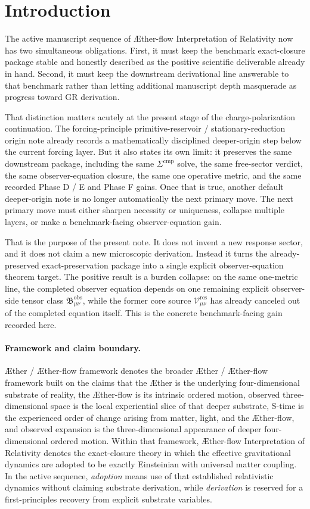 \documentclass[11pt]{article}
\newcommand{\Aether}{\AE{}ther}
\newcommand{\Aflow}{\AE{}ther-flow}
\newcommand{\TheoryName}{\Aflow{} Interpretation of Relativity}
\newcommand{\TheoryProgram}{\Aether{} / \Aflow{} framework}
\newcommand{\ResidualCore}{\mathcal V_{\mu\nu}^{\mathrm{res}}}
\newcommand{\ObsBurden}{\mathfrak B_{\mu\nu}^{\mathrm{obs}}}
\begin{document}
\section{Introduction}

The active manuscript sequence of \TheoryName{} now has two simultaneous obligations. First, it must keep the benchmark exact-closure package stable and honestly described as the positive scientific deliverable already in hand. Second, it must keep the downstream derivational line answerable to that benchmark rather than letting additional manuscript depth masquerade as progress toward GR derivation.

That distinction matters acutely at the present stage of the charge-polarization continuation. The forcing-principle primitive-reservoir / stationary-reduction origin note already records a mathematically disciplined deeper-origin step below the current forcing layer. But it also states its own limit: it preserves the same downstream package, including the same \(\Sigma^{\mathrm{cmp}}\) solve, the same free-sector verdict, the same observer-equation closure, the same one operative metric, and the same recorded Phase D / E and Phase F gains. Once that is true, another default deeper-origin note is no longer automatically the next primary move. The next primary move must either sharpen necessity or uniqueness, collapse multiple layers, or make a benchmark-facing observer-equation gain.

That is the purpose of the present note. It does not invent a new response sector, and it does not claim a new microscopic derivation. Instead it turns the already-preserved exact-preservation package into a single explicit observer-equation theorem target. The positive result is a burden collapse: on the same one-metric line, the completed observer equation depends on one remaining explicit observer-side tensor class \(\ObsBurden\), while the former core source \(\ResidualCore\) has already canceled out of the completed equation itself. This is the concrete benchmark-facing gain recorded here.

\paragraph{Framework and claim boundary.}
\TheoryProgram{} denotes the broader \Aether{} / \Aflow{} framework built on the claims that the \Aether{} is the underlying four-dimensional substrate of reality, the \Aflow{} is its intrinsic ordered motion, observed three-dimensional space is the local experiential slice of that deeper substrate, S-time is the experienced order of change arising from matter, light, and the \Aflow{}, and observed expansion is the three-dimensional appearance of deeper four-dimensional ordered motion. Within that framework, \TheoryName{} denotes the exact-closure theory in which the effective gravitational dynamics are adopted to be exactly Einsteinian with universal matter coupling. In the active sequence, \emph{adoption} means use of that established relativistic dynamics without claiming substrate derivation, while \emph{derivation} is reserved for a first-principles recovery from explicit substrate variables.
\end{document}
